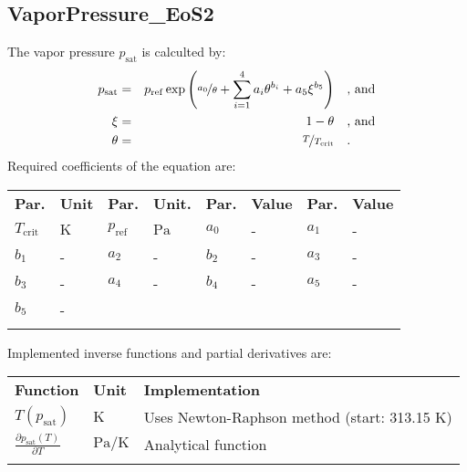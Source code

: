 \subsection{VaporPressure\_EoS2}
\label{cha:approaches:refp:eos2}
%
The vapor pressure $p_\mathrm{sat}$ is calculted by:
%
\begin{equation*}
	\begin{split}
		p_\mathrm{sat} &=& p_\mathrm{ref} \exp \left( \nicefrac{a_0}{\theta} + \sum_{i=1}^{4} a_i \theta^{b_i} + a_5 \xi^{b_5} \right) & \quad\text{, and} \\
		\xi &=& 1 - \theta & \quad\text{, and} \\
		\theta &=& \nicefrac{T}{T_\mathrm{crit}} & \quad\text{.}
	\end{split}
\end{equation*}
%
Required coefficients of the equation are:
%
\begin{longtable}[l]{ll|ll|ll|ll}
\toprule
\addlinespace
\textbf{Par.} & \textbf{Unit} & \textbf{Par.} &	\textbf{Unit.} & \textbf{Par.} & \textbf{Value} & \textbf{Par.} & \textbf{Value} \\
\addlinespace
\midrule
\endhead

\bottomrule
\endfoot
\bottomrule
\endlastfoot
\addlinespace

$T_\mathrm{crit}$ & $\si{\kelvin}$ & $p_\mathrm{ref}$ & $\si{\pascal}$ &$a_0$ & - & $a_1$ & - \\	
$b_1$ & - &	$a_2$ & - &	$b_2$ & - &	$a_3$ & - \\	
$b_3$ & - &	$a_4$ & - &	$b_4$ & - &	$a_5$ & - \\	
$b_5$ & - &	& &	& & & \\


\addlinespace
\end{longtable}
%
Implemented inverse functions and partial derivatives are:
%
\begin{longtable}[l]{l|l|l}
	\toprule
	\addlinespace
	\textbf{Function} & \textbf{Unit} &	\textbf{Implementation} \\
	\addlinespace
	\midrule
	\endhead
	
	\bottomrule
	\endfoot
	\bottomrule
	\endlastfoot
	\addlinespace
	
	$T(p_\mathrm{sat})$	& $\si{\kelvin}$ & Uses Newton-Raphson method (start: 313.15 K) \\
	$\frac{\partial p_\mathrm{sat}(T)}{\partial T}$	& $\si{\pascal\per\kelvin}$ & Analytical function\\
	
	\addlinespace
\end{longtable}
%

